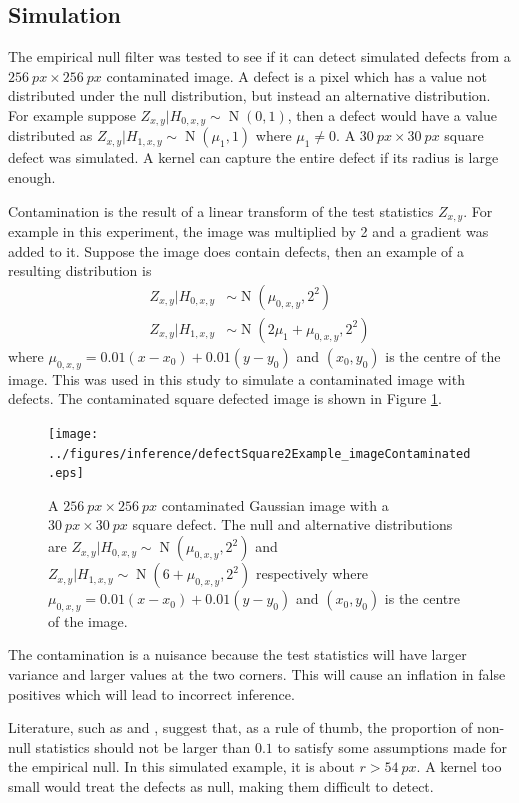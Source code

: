 \documentclass{proc}
\DeclareMathOperator{\normal}{N}
\begin{document}
\subsection{Simulation}

The empirical null filter was tested to see if it can detect simulated defects from a $\SI{256}{px}\times \SI{256}{px}$ contaminated image. A defect is a pixel which has a value not distributed under the null distribution, but instead an alternative distribution. For example suppose $Z_{x,y}|H_{0,x,y}\sim\normal(0,1)$, then a defect would have a value distributed as $Z_{x,y}|H_{1,x,y}\sim\normal(\mu_{1},1)$ where $\mu_1\neq0$. A $\SI{30}{px}\times \SI{30}{px}$ square defect was simulated. A kernel can capture the entire defect if its radius is large enough.

Contamination is the result of a linear transform of the test statistics $Z_{x,y}$. For example in this experiment, the image was multiplied by 2 and a gradient was added to it. Suppose the image does contain defects, then an example of a resulting distribution is
\begin{align}
  Z_{x,y}|H_{0,x,y}&\sim\normal(\mu_{0,x,y},2^2)
  \\
  Z_{x,y}|H_{1,x,y}&\sim\normal(2\mu_1+\mu_{0,x,y},2^2)
\end{align}
where $\mu_{0,x,y}=0.01(x-x_0)+0.01(y-y_0)$ and $(x_0,y_0)$ is the centre of the image. This was used in this study to simulate a contaminated image with defects. The contaminated square defected image is shown in Figure \ref{fig:inference_defectSquare2Example}.

\begin{figure}
  \centering
  \texttt{[image: ../figures/inference/defectSquare2Example\_imageContaminated.eps]}
  \caption{A $\SI{256}{px}\times \SI{256}{px}$ contaminated Gaussian image with a $\SI{30}{px} \times \SI{30}{px}$ square defect. The null and alternative distributions are $Z_{x,y}|H_{0,x,y}\sim\normal(\mu_{0,x,y},2^2)$ and $Z_{x,y}|H_{1,x,y}\sim\normal(6+\mu_{0,x,y},2^2)$ respectively where $\mu_{0,x,y}=0.01(x-x_0)+0.01(y-y_0)$ and $(x_0,y_0)$ is the centre of the image.}
  \label{fig:inference_defectSquare2Example}
\end{figure}

The contamination is a nuisance because the test statistics will have larger variance and larger values at the two corners. This will cause an inflation in false positives which will lead to incorrect inference. 

Literature, such as \cite{efron2004large} and \cite{schwartzman2008empirical}, suggest that, as a rule of thumb, the proportion of non-null statistics should not be larger than $0.1$ to satisfy some assumptions made for the empirical null. In this simulated example, it is about $r>\SI{54}{px}$. A kernel too small would treat the defects as null, making them difficult to detect.
\end{document}
